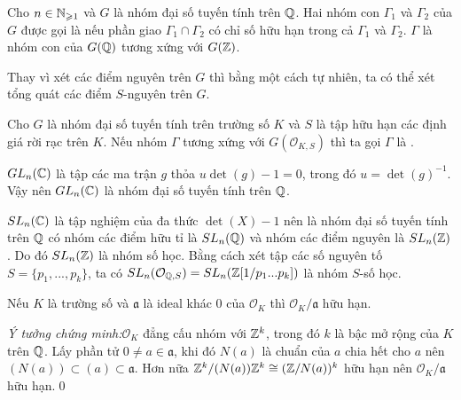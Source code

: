 \begin{define}
    Cho $n \in \mathbb N_{\geqslant 1}$ và $G$ là nhóm đại số tuyến tính trên $\mathbb Q$. Hai nhóm con $\Gamma_1$ và $\Gamma_2$ của $G$ được gọi là  nếu phần giao $\Gamma_1 \cap \Gamma_2$ có chỉ số hữu hạn trong cả $\Gamma_1$ và $\Gamma_2$.  $\Gamma$ là nhóm con của $G(\mathbb Q)$ tương xứng với $G(\mathbb Z)$.
\end{define}

Thay vì xét các điểm nguyên trên $G$ thì bằng một cách tự nhiên, ta có thể xét tổng quát các điểm $S$-nguyên trên $G$.

\begin{define}
    Cho $G$ là nhóm đại số tuyến tính trên trường số $K$ và $S$ là tập hữu hạn các định giá rời rạc trên $K$. Nếu nhóm $\Gamma$ tương xứng với $G(\mathcal{O}_{K,S})$ thì ta gọi $\Gamma$ là .
\end{define}

\begin{example}
    $GL_n(\mathbb C)$ là tập các ma trận $g$ thỏa $u \det(g) - 1 = 0$, trong đó $u = \det(g)^{-1}$. Vậy nên $GL_n(\mathbb C)$ là nhóm đại số tuyến tính trên $\mathbb Q$.
\end{example}

\begin{example}
    $SL_n(\mathbb C)$ là tập nghiệm của đa thức $\det(X) - 1$ nên là nhóm đại số tuyến tính trên $\mathbb Q$ có nhóm các điểm hữu tỉ là $SL_n(\mathbb Q)$ và nhóm các điểm nguyên là $SL_n(\mathbb Z)$. Do đó $SL_n(\mathbb Z)$ là nhóm số học. Bằng cách xét tập các số nguyên tố $S = \{p_1,...,p_k\}$, ta có $SL_n(\mathcal{O}_{\mathbb Q,S}) = SL_n(\mathbb Z[1/p_1...p_k])$ là nhóm $S$-số học.
\end{example}

\begin{lemma}
    Nếu $K$ là trường số và $\mathfrak{a}$ là ideal khác $0$ của $\mathcal{O}_K$ thì $\mathcal{O}_K / \mathfrak{a}$ hữu hạn.

    \textit{Ý tưởng chứng minh:}\enskip $\mathcal{O}_K$ đẳng cấu nhóm với $\mathbb Z^k$, trong đó $k$ là bậc mở rộng của $K$ trên $\mathbb Q$. Lấy phần tử $0\neq a \in \mathfrak{a}$, khi đó $N(a)$ là chuẩn của $a$ chia hết cho $a$ nên $(N(a)) \subset (a) \subset \mathfrak{a}$. Hơn nữa $\mathbb Z^k / (N(a)) \mathbb Z^k \cong (\mathbb Z / N(a))^k$ hữu hạn nên $\mathcal{O}_K / \mathfrak{a}$ hữu hạn.\qed
\end{lemma}


